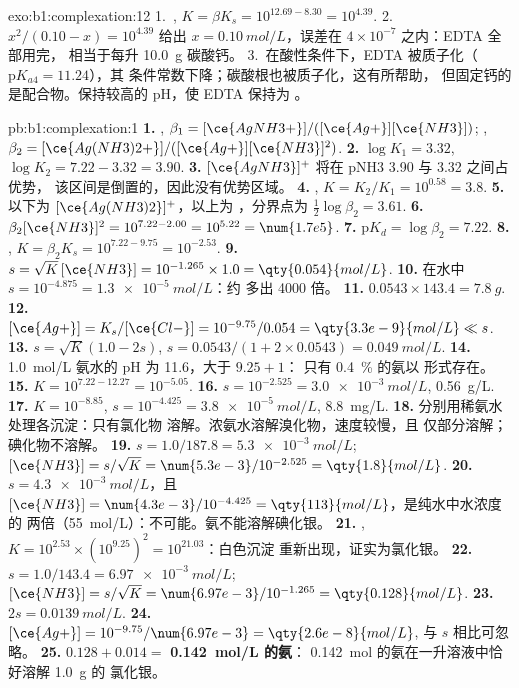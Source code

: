 \begin{solution}{exo:b1:complexation:12}
1.~, $K = \beta K_s = 10^{12.69 -
8.30} = 10^{4.39}$.
2.~$x^2/(0.10 - x) = 10^{4.39}$ 给出 $x = \qty{0.10}{mol/L}$，误差在
$4 \times 10^{-7}$ 之内：EDTA 全部用完，
相当于每升 \qty{10.0}{g} 碳酸钙。
3.~在酸性条件下，EDTA 被质子化（$\mathrm{p}K_{a4} = 11.24$），其
条件常数下降；碳酸根也被质子化，这有所帮助，
但固定钙的是配合物。保持较高的 pH，使
EDTA 保持为 。
\end{solution}

\begin{solution}{pb:b1:complexation:1}
\textbf{1.} , $\beta_1 = [\ce{AgNH3+}]/([\ce{Ag+}][\ce{NH3}])$;
, $\beta_2 = [\ce{Ag(NH3)2+}]/([\ce{Ag+}][\ce{NH3}]^2)$.
\textbf{2.} $\log K_1 = 3.32$, $\log K_2 = 7.22 - 3.32 = 3.90$.
\textbf{3.} $[\ce{AgNH3}]^{+}$ 将在 pNH3 3.90 与 3.32 之间占优势，
该区间是倒置的，因此没有优势区域。
\textbf{4.} , $K = K_2/K_1 = 10^{0.58} =
3.8$.
\textbf{5.} 以下为 $[\ce{Ag(NH3)2}]^{+}$，以上为 ，分界点为
$\frac12\log\beta_2 = 3.61$.
\textbf{6.} $\beta_2[\ce{NH3}]^2 = 10^{7.22 - 2.00} = 10^{5.22} = \num{1.7e5}$.
\textbf{7.} $\mathrm{p}K_d = \log\beta_2 = 7.22$.
\textbf{8.} , $K = \beta_2K_s =
10^{7.22 - 9.75} = 10^{-2.53}$.
\textbf{9.} $s = \sqrt{K}\,[\ce{NH3}] = 10^{-1.265} \times 1.0 =
\qty{0.054}{mol/L}$.
\textbf{10.} 在水中 $s = 10^{-4.875} = \qty{1.3e-5}{mol/L}$：约
多出 4000 倍。
\textbf{11.} $0.0543 \times 143.4 = \qty{7.8}{g}$.
\textbf{12.} $[\ce{Ag+}] = K_s/[\ce{Cl-}] = 10^{-9.75}/0.054 =
\qty{3.3e-9}{mol/L} \ll s$.
\textbf{13.} $s = \sqrt{K}(1.0 - 2s)$, $s = 0.0543/(1 + 2 \times 0.0543) =
\qty{0.049}{mol/L}$.
\textbf{14.} \qty{1.0}{mol/L} 氨水的 pH 为 11.6，大于 $9.25 + 1$：
只有 \qty{0.4}{\percent} 的氨以  形式存在。
\textbf{15.} $K = 10^{7.22 - 12.27} = 10^{-5.05}$.
\textbf{16.} $s = 10^{-2.525} = \qty{3.0e-3}{mol/L}$, \qty{0.56}{g/L}.
\textbf{17.} $K = 10^{-8.85}$, $s = 10^{-4.425} = \qty{3.8e-5}{mol/L}$,
\qty{8.8}{mg/L}.
\textbf{18.} 分别用稀氨水处理各沉淀：只有氯化物
溶解。浓氨水溶解溴化物，速度较慢，且
仅部分溶解；碘化物不溶解。
\textbf{19.} $s = 1.0/187.8 = \qty{5.3e-3}{mol/L}$; $[\ce{NH3}] = s/\sqrt{K}
= \num{5.3e-3}/10^{-2.525} = \qty{1.8}{mol/L}$.
\textbf{20.} $s = \qty{4.3e-3}{mol/L}$，且 $[\ce{NH3}] = \num{4.3e-3}/10^{-4.425}
= \qty{113}{mol/L}$，是纯水中水浓度的
两倍（\qty{55}{mol/L}）：不可能。氨不能溶解碘化银。
\textbf{21.} ,
$K = 10^{2.53} \times (10^{9.25})^2 = 10^{21.03}$：白色沉淀
重新出现，证实为氯化银。
\textbf{22.} $s = 1.0/143.4 = \qty{6.97e-3}{mol/L}$; $[\ce{NH3}] =
s/\sqrt{K} = \num{6.97e-3}/10^{-1.265} = \qty{0.128}{mol/L}$.
\textbf{23.} $2s = \qty{0.0139}{mol/L}$.
\textbf{24.} $[\ce{Ag+}] = 10^{-9.75}/\num{6.97e-3} = \qty{2.6e-8}{mol/L}$,
与 $s$ 相比可忽略。
\textbf{25.} $0.128 + 0.014 = $ \textbf{\qty{0.142}{mol/L} 的氨}：
\qty{0.142}{mol} 的氨在一升溶液中恰好溶解 \qty{1.0}{g} 的
氯化银。
\end{solution}
